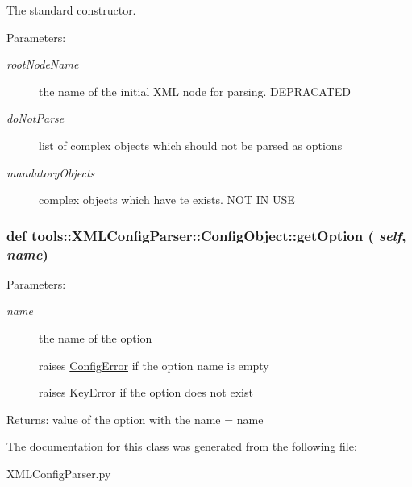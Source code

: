The standard constructor. 

\begin{Desc}
\item[Parameters:]
\begin{description}
\item[{\em rootNodeName}]the name of the initial XML node for parsing. DEPRACATED \item[{\em doNotParse}]list of complex objects which should not be parsed as options \item[{\em mandatoryObjects}]complex objects which have te exists. NOT IN USE \end{description}
\end{Desc}
\hypertarget{classtools_1_1XMLConfigParser_1_1ConfigObject_74b01910a3f928e337b2ee658ddea97b}{
\subsubsection{\setlength{\rightskip}{0pt plus 5cm}def tools::XMLConfigParser::ConfigObject::getOption ( {\em self}, \/   {\em name})}}
\label{classtools_1_1XMLConfigParser_1_1ConfigObject_74b01910a3f928e337b2ee658ddea97b}


\begin{Desc}
\item[Parameters:]
\begin{description}
\item[{\em name}]the name of the option  \par
 raises \hyperlink{classtools_1_1XMLConfigParser_1_1ConfigError}{ConfigError} if the option name is empty  \par
 raises KeyError if the option does not exist \end{description}
\end{Desc}
\begin{Desc}
\item[Returns:]value of the option with the name = name \end{Desc}


The documentation for this class was generated from the following file:\begin{CompactItemize}
\item 
XMLConfigParser.py\end{CompactItemize}
